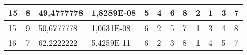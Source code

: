 \documentclass[conference]{IEEEtran}
\begin{document}
\begin{table*}[]
\begin{tabular}{|llll|llllllll|}
\multicolumn{1}{|l|}{15}                                                    & \multicolumn{1}{l|}{8}                                                        & \multicolumn{1}{l|}{49,4777778}                                                   & 1,8289E-08                     & \multicolumn{1}{l|}{5}                                                  & \multicolumn{1}{l|}{4}                                                  & \multicolumn{1}{l|}{6}                                                  & \multicolumn{1}{l|}{8}                                                  & \multicolumn{1}{l|}{2}                                                  & \multicolumn{1}{l|}{\textbf{1}}                                         & \multicolumn{1}{l|}{3}                                                  & 7                          \\ \hline
\multicolumn{1}{|l|}{15}                                                    & \multicolumn{1}{l|}{9}                                                        & \multicolumn{1}{l|}{50,6777778}                                                   & 1,0631E-08                     & \multicolumn{1}{l|}{6}                                                  & \multicolumn{1}{l|}{2}                                                  & \multicolumn{1}{l|}{5}                                                  & \multicolumn{1}{l|}{7}                                                  & \multicolumn{1}{l|}{\textbf{1}}                                         & \multicolumn{1}{l|}{3}                                                  & \multicolumn{1}{l|}{4}                                                  & 8                          \\ \hline
\multicolumn{1}{|l|}{16}                                                    & \multicolumn{1}{l|}{7}                                                        & \multicolumn{1}{l|}{62,2222222}                                                   & 5,4259E-11                     & \multicolumn{1}{l|}{6}                                                  & \multicolumn{1}{l|}{2}                                                  & \multicolumn{1}{l|}{3}                                                  & \multicolumn{1}{l|}{8}                                                  & \multicolumn{1}{l|}{\textbf{1}}                                         & \multicolumn{1}{l|}{4}                                                  & \multicolumn{1}{l|}{5}                                                  & 7                          \\ \hline

\end{tabular}
\end{table*}
\end{document}
